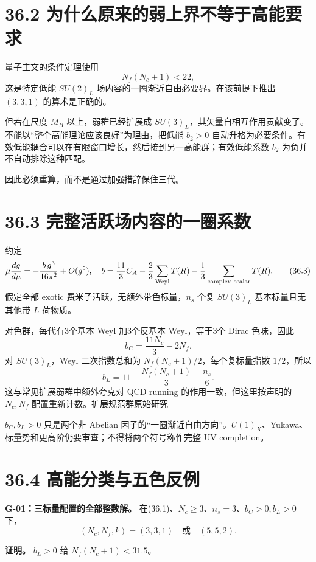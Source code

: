 \documentclass[
  11pt,
  oneside]{book}
\begin{document}
\section{36.2 为什么原来的弱上界不等于高能要求}

量子主文的条件定理使用 \[
N_f(N_c+1)<22,
\tag{36.2}
\] 这是特定低能 \(SU(2)_L\) 场内容的一圈渐近自由必要界。在该前提下推出
\((3,3,1)\) 的算术是正确的。

但若在尺度 \(M_B\) 以上，弱群已经扩展成
\(SU(3)_L\)，其矢量自相互作用贡献变了。不能以``整个高能理论应该良好''为理由，把低能
\(b_2>0\)
自动升格为必要条件。有效低能耦合可以在有限窗口增长，然后接到另一高能群；有效低能系数
\(b_2\) 为负并不自动排除这种匹配。

因此必须重算，而不是通过加强措辞保住三代。

\section{36.3 完整活跃场内容的一圈系数}

约定 \[
\mu\frac{dg}{d\mu}=-\frac{b\,g^3}{16\pi^2}+O(g^5),\quad
b=\frac{11}{3}C_A-\frac23\sum_{\rm Weyl}T(R)
-\frac13\sum_{\rm complex\ scalar}T(R).
\tag{36.3}
\] 假定全部 exotic 费米子活跃，无额外带色标量，\(n_s\) 个复 \(SU(3)_L\)
基本标量且无其他带 \(L\) 荷物质。

对色群，每代有3个基本 Weyl 加3个反基本 Weyl，等于3个 Dirac 色味，因此 \[
b_C=\frac{11N_c}{3}-2N_f.
\tag{36.4}
\] 对 \(SU(3)_L\)，Weyl 二次指数总和为 \(N_f(N_c+1)/2\)，每个复标量指数
\(1/2\)，所以 \[
b_L=11-\frac{N_f(N_c+1)}3-\frac{n_s}{6}.
\tag{36.5}
\] 这与常见扩展弱群中额外夸克对 QCD running 的作用一致，但这里按声明的
\(N_c,N_f\)
配置重新计数。\href{https://arxiv.org/abs/1205.4483}{扩展规范群原始研究}

\(b_C,b_L>0\) 只是两个非 Abelian
因子的``一圈渐近自由方向''。\(U(1)_X\)、Yukawa、标量势和更高阶仍要审查；不得将两个符号称作完整
UV completion。

\section{36.4 高能分类与五色反例}

\protect\hypertarget{g-01}{}{}

\textbf{G-01：三标量配置的全部整数解。}
在(36.1)、\(N_c\ge3\)、\(n_s=3\)、\(b_C>0,b_L>0\) 下， \[
(N_c,N_f,k)=(3,3,1)\quad\text{或}\quad(5,5,2).
\tag{36.6}
\]

\textbf{证明。} \(b_L>0\) 给 \(N_f(N_c+1)<31.5\)。
\end{document}
